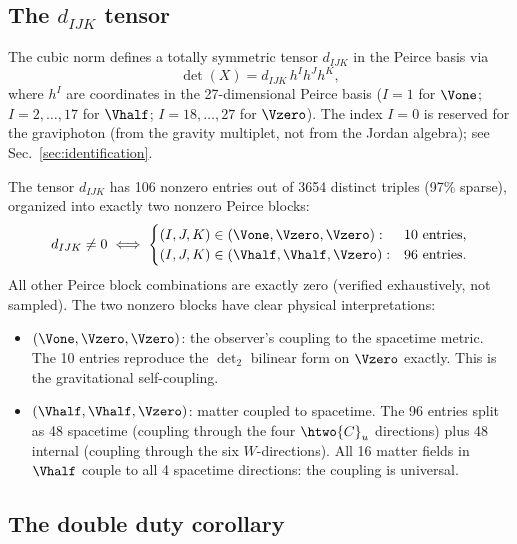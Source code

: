 \subsection{The $d_{IJK}$ tensor}

The cubic norm defines a totally symmetric tensor $d_{IJK}$ in the
Peirce basis via
\begin{equation}
\label{eq:dijk}
\det(X) = d_{IJK}\, h^I h^J h^K,
\end{equation}
where $h^I$ are coordinates in the 27-dimensional Peirce basis
($I = 1$ for $\Vone$; $I = 2, \ldots, 17$ for $\Vhalf$;
$I = 18, \ldots, 27$ for $\Vzero$). The index $I = 0$ is reserved
for the graviphoton (from the gravity multiplet, not from the Jordan
algebra); see Sec.~\ref{sec:identification}.

The tensor $d_{IJK}$ has 106 nonzero entries out of 3654 distinct
triples (97\% sparse), organized into exactly two nonzero Peirce
blocks:
\begin{equation}
\label{eq:dijk-blocks}
d_{IJK} \neq 0 \;\Longleftrightarrow\;
\begin{cases}
(I, J, K) \in (\Vone, \Vzero, \Vzero): & 10 \text{ entries}, \\
(I, J, K) \in (\Vhalf, \Vhalf, \Vzero): & 96 \text{ entries}.
\end{cases}
\end{equation}
All other Peirce block combinations are exactly zero (verified
exhaustively, not sampled). The two nonzero blocks have clear physical
interpretations:

\begin{itemize}
\item $(\Vone, \Vzero, \Vzero)$: the observer's coupling to the
  spacetime metric. The 10 entries reproduce the $\det_2$ bilinear form
  on $\Vzero$ exactly. This is the gravitational self-coupling.

\item $(\Vhalf, \Vhalf, \Vzero)$: matter coupled to spacetime. The 96
  entries split as 48 spacetime (coupling through the four $\htwo{C}_u$
  directions) plus 48 internal (coupling through the six $W$-directions).
  All 16 matter fields in $\Vhalf$ couple to all 4 spacetime directions:
  the coupling is universal.
\end{itemize}

\subsection{The double duty corollary}

